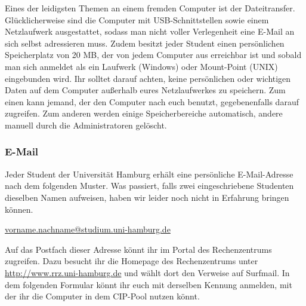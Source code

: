Eines der leidigsten Themen an einem fremden Computer ist der Dateitransfer.
Glücklicherweise sind die Computer mit USB-Schnittstellen sowie einem
Netzlaufwerk ausgestattet, sodass man nicht voller Verlegenheit eine E-Mail an
sich selbst adressieren muss. Zudem besitzt jeder Student einen persönlichen
Speicherplatz von 20 MB, der von jedem Computer aus erreichbar ist und sobald
man sich anmeldet als ein Laufwerk (Windows) oder Mount-Point (UNIX)
eingebunden wird. Ihr solltet darauf achten, keine persönlichen oder wichtigen
Daten auf dem Computer außerhalb eures Netzlaufwerkes zu speichern. Zum einen
kann jemand, der den Computer nach euch benutzt, gegebenenfalls darauf
zugreifen. Zum anderen werden einige Speicherbereiche automatisch, andere
manuell durch die Administratoren gelöscht.

\subsubsection{E-Mail}

Jeder Student der Universität Hamburg erhält eine persönliche E-Mail-Adresse
nach dem folgenden Muster. Was passiert, falls zwei eingeschriebene Studenten
dieselben Namen aufweisen, haben wir leider noch nicht in Erfahrung bringen
können.

\url{vorname.nachname@studium.uni-hamburg.de}

Auf das Postfach dieser Adresse könnt ihr im Portal des Rechenzentrums
zugreifen. Dazu besucht ihr die Homepage des Rechenzentrums unter
\url{http://www.rrz.uni-hamburg.de} und wählt dort den Verweise auf Surfmail.
In dem folgenden Formular könnt ihr euch mit derselben Kennung anmelden, mit
der ihr die Computer in dem CIP-Pool nutzen könnt.
